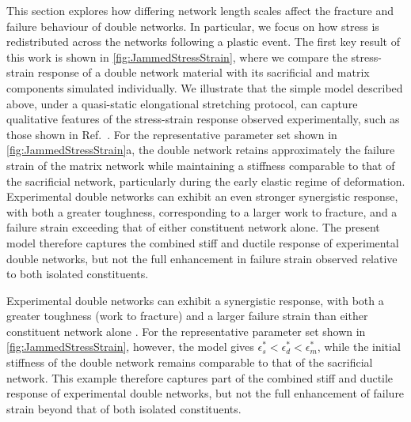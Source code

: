 This section explores how differing network length scales affect the fracture and failure behaviour of double networks. In particular, we focus on how stress is redistributed across the networks following a plastic event. The first key result of this work is shown in \cref{fig:JammedStressStrain}, where we compare the stress-strain response of a double network material with its sacrificial and matrix components simulated individually. We illustrate that the simple model described above, under a quasi-static elongational stretching protocol, can capture qualitative features of the stress-strain response observed experimentally, such as those shown in Ref.~\cite{gong_why_2010}. For the representative parameter set shown in \cref{fig:JammedStressStrain}a, the double network retains approximately the failure strain of the matrix network while maintaining a stiffness comparable to that of the sacrificial network, particularly during the early elastic regime of deformation. Experimental double networks can exhibit an even stronger synergistic response, with both a greater toughness, corresponding to a larger work to fracture, and a failure strain exceeding that of either constituent network alone. The present model therefore captures the combined stiff and ductile response of experimental double networks, but not the full enhancement in failure strain observed relative to both isolated constituents.


Experimental double networks can exhibit a synergistic response, with both a greater toughness (work to fracture) and a larger failure strain than either constituent network alone \cite{gong_double-network_2003,gong_why_2010,ducrot_toughening_2014,millereauMechanicsElastomericMolecular2018}. For the representative parameter set shown in \cref{fig:JammedStressStrain}, however, the model gives $\epsilon_s^*<\epsilon_d^*<\epsilon_m^*$, while the initial stiffness of the double network remains comparable to that of the sacrificial network. This example therefore captures part of the combined stiff and ductile response of experimental double networks, but not the full enhancement of failure strain beyond that of both isolated constituents.

